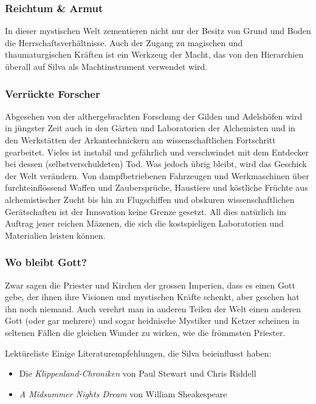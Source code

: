 \documentclass[10pt,twoside,twocolumn,openany]{book}
\begin{document}
\subsubsection{Reichtum \& Armut}
In dieser mystischen Welt zementieren nicht nur der Besitz von Grund und Boden die Herrschaftsverhältnisse. Auch der Zugang zu magischen und thaumaturgischen Kräften ist ein Werkzeug der Macht, das von den Hierarchien überall auf Silva als Machtinstrument verwendet wird.


\subsubsection{Verrückte Forscher}
Abgesehen von der althergebrachten Forschung der Gilden und Adelshöfen wird in jüngster Zeit auch in den Gärten und Laboratorien der Alchemisten und in den Werkstätten der Arkantechnickern am wissenschaftlichen Fortschritt gearbeitet. Vieles ist instabil und gefährlich und verschwindet mit dem Entdecker bei dessen (selbstverschuldeten) Tod. Was jedoch übrig bleibt, wird das Geschick der Welt verändern. Von dampfbetriebenen Fahrzeugen und Werkmaschinen über furchteinflössend Waffen und Zaubersprüche, Haustiere und köstliche Früchte aus alchemistischer Zucht bis hin zu Flugschiffen und obskuren wissenschaftlichen Gerätschaften ist der Innovation keine Grenze gesetzt. All dies natürlich im Auftrag jener reichen Mäzenen, die sich die kostspieligen Laboratorien und Materialien leisten können.

\subsubsection{Wo bleibt Gott?}
Zwar sagen die Priester und Kirchen der grossen Imperien, dass es einen Gott gebe, der ihnen ihre Visionen und mystischen Kräfte schenkt, aber gesehen hat ihn noch niemand. Auch verehrt man in anderen Teilen der Welt einen anderen Gott (oder gar mehrere) und sogar heidnische Mystiker und Ketzer scheinen in seltenen Fällen die gleichen Wunder zu wirken, wie die frömmsten Priester.

\begin{table}[b]
	\begin{commentbox}{Lektüreliste}
		Einige Literaturempfehlungen, die Silva beieinflusst haben:
		\begin{itemize}
			\item Die \emph{Klippenland-Chroniken} von Paul Stewart und Chris Riddell
			\item \emph{A Midsummer Nights Dream} von William Sheakespeare
		\end{itemize}
	\end{commentbox}
\end{table}
\end{document}
